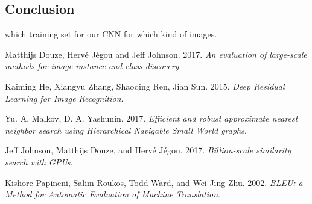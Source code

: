 \documentclass[a4paper]{article}
\begin{document}
	\subsection{}
	\subsection{Conclusion}
	
	which training set for our CNN for which kind of images.

\begin{thebibliography}{5}

Matthijs Douze, Hervé Jégou and Jeff Johnson. 2017.
\textit{An evaluation of large-scale methods for image instance and class discovery}.

Kaiming He, Xiangyu Zhang, Shaoqing Ren, Jian Sun. 2015.
\textit{Deep Residual Learning for Image Recognition}.

Yu. A. Malkov, D. A. Yashunin. 2017.
\textit{Efficient and robust approximate nearest neighbor search using Hierarchical Navigable Small World graphs}.

Jeff Johnson, Matthijs Douze, and Hervé Jégou. 2017.
\textit{Billion-scale similarity search with GPUs}. 

Kishore Papineni, Salim Roukos, Todd Ward, and Wei-Jing Zhu. 2002.
\textit{BLEU: a Method for Automatic Evaluation of Machine Translation}. 


\end{thebibliography}
\end{document}
